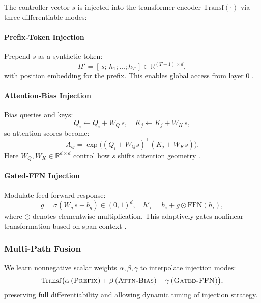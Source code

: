 The controller vector \(s\) is injected into the transformer encoder \(\mathrm{Transf}(\cdot)\) via three differentiable modes:

\paragraph{Prefix‐Token Injection}

Prepend \(s\) as a synthetic token:
\[
H' = [\,s;\,h_1;\dots;h_T\,]\in\mathbb{R}^{(T+1)\times d},
\]
with position embedding for the prefix. This enables global access from layer 0 \cite{li2021prefix}.

\paragraph{Attention‐Bias Injection}

Bias queries and keys:
\[
Q_i \leftarrow Q_i + W_Q\,s,
\quad
K_j \leftarrow K_j + W_K\,s,
\]
so attention scores become:
\[
A_{ij} = \exp\bigl((Q_i + W_Q s)^\top(K_j + W_K s)\bigr).
\]
Here \(W_Q,W_K\in\mathbb{R}^{d\times d}\) control how \(s\) shifts attention geometry \cite{hu2021lora}.

\paragraph{Gated‐FFN Injection}

Modulate feed-forward response:
\[
g = \sigma(W_g\,s + b_g)\in(0,1)^d,
\quad
h'_i = h_i + g\odot\mathrm{FFN}(h_i),
\]
where \(\odot\) denotes elementwise multiplication. This adaptively gates nonlinear transformation based on span context \cite{shazeer2017outrageously}.

\subsubsection{Multi-Path Fusion}

We learn nonnegative scalar weights \(\alpha,\beta,\gamma\) to interpolate injection modes:
\[
\mathrm{Transf}\bigl(
\alpha\,\textsc{(Prefix)} + 
\beta\,\textsc{(Attn-Bias)} +
\gamma\,\textsc{(Gated-FFN)}
\bigr),
\]
preserving full differentiability and allowing dynamic tuning of injection strategy.